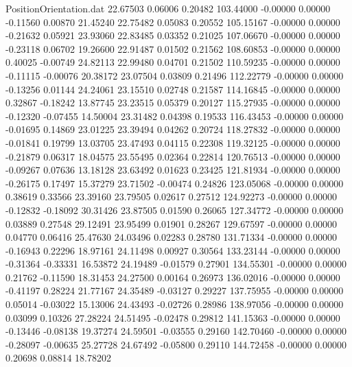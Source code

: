 \begin{filecontents}{PositionOrientation.dat}
  22.67503    0.06006    0.20482   103.44000   -0.00000    0.00000   -0.11560    0.00870   21.45240
  22.75482    0.05083    0.20552   105.15167   -0.00000    0.00000   -0.21632    0.05921   23.93060
  22.83485    0.03352    0.21025   107.06670   -0.00000    0.00000   -0.23118    0.06702   19.26600
  22.91487    0.01502    0.21562   108.60853   -0.00000    0.00000    0.40025   -0.00749   24.82113
  22.99480    0.04701    0.21502   110.59235   -0.00000    0.00000   -0.11115   -0.00076   20.38172
  23.07504    0.03809    0.21496   112.22779   -0.00000    0.00000   -0.13256    0.01144   24.24061
  23.15510    0.02748    0.21587   114.16845   -0.00000    0.00000    0.32867   -0.18242   13.87745
  23.23515    0.05379    0.20127   115.27935   -0.00000    0.00000   -0.12320   -0.07455   14.50004
  23.31482    0.04398    0.19533   116.43453   -0.00000    0.00000   -0.01695    0.14869   23.01225
  23.39494    0.04262    0.20724   118.27832   -0.00000    0.00000   -0.01841    0.19799   13.03705
  23.47493    0.04115    0.22308   119.32125   -0.00000    0.00000   -0.21879    0.06317   18.04575
  23.55495    0.02364    0.22814   120.76513   -0.00000    0.00000   -0.09267    0.07636   13.18128
  23.63492    0.01623    0.23425   121.81934   -0.00000    0.00000   -0.26175    0.17497   15.37279
  23.71502   -0.00474    0.24826   123.05068   -0.00000    0.00000    0.38619    0.33566   23.39160
  23.79505    0.02617    0.27512   124.92273   -0.00000    0.00000   -0.12832   -0.18092   30.31426
  23.87505    0.01590    0.26065   127.34772   -0.00000    0.00000    0.03889    0.27548   29.12491
  23.95499    0.01901    0.28267   129.67597   -0.00000    0.00000    0.04770    0.06416   25.47630
  24.03496    0.02283    0.28780   131.71334   -0.00000    0.00000   -0.16943    0.22296   18.97161
  24.11498    0.00927    0.30564   133.23144   -0.00000    0.00000   -0.31364   -0.33331   16.53872
  24.19489   -0.01579    0.27901   134.55301   -0.00000    0.00000    0.21762   -0.11590   18.31453
  24.27500    0.00164    0.26973   136.02016   -0.00000    0.00000   -0.41197    0.28224   21.77167
  24.35489   -0.03127    0.29227   137.75955   -0.00000    0.00000    0.05014   -0.03022   15.13006
  24.43493   -0.02726    0.28986   138.97056   -0.00000    0.00000    0.03099    0.10326   27.28224
  24.51495   -0.02478    0.29812   141.15363   -0.00000    0.00000   -0.13446   -0.08138   19.37274
  24.59501   -0.03555    0.29160   142.70460   -0.00000    0.00000   -0.28097   -0.00635   25.27728
  24.67492   -0.05800    0.29110   144.72458   -0.00000    0.00000    0.20698    0.08814   18.78202

\end{filecontents}
